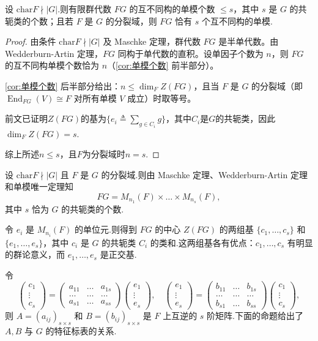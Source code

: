 \begin{theorem}
设 $\mathrm{char}F \nmid |G|$.则有限群代数 $FG$ 的互不同构的单模个数 $\leq s$，其中 $s$ 是 $G$ 的共轭类的个数；且若 $F$ 是 $G$ 的分裂域，则 $FG$ 恰有 $s$ 个互不同构的单模.
\end{theorem}

\begin{proof}
由条件 $\mathrm{char}F \nmid |G|$ 及 Maschke 定理，群代数 $FG$ 是半单代数。由 Wedderburn-Artin 定理，$FG$ 同构于单代数的直积。设单因子个数为 $n$，则 $FG$ 的互不同构单模个数恰为 $n$（\cref{cor:单模个数} 前半部分）。

\cref{cor:单模个数} 后半部分给出：$n \leq \dim_F Z(FG)$，且当 $F$ 是 $G$ 的分裂域（即 $\operatorname{End}_{FG}(V) \cong F$ 对所有单模 $V$ 成立）时取等号。

\noindent{} 前文已证明$Z(FG)$的基为$\{e_i\triangleq \sum_{g\in C_i}g\}$，其中$C_i$是$G$的共轭类，因此$\dim_F Z(FG)=s$.\par
综上所述$n \leq s$，且$F$为分裂域时$n = s$.
\end{proof}

设 $\mathrm{char}F \nmid |G|$ 且 $F$ 是 $G$ 的分裂域.则由 Maschke 定理、Wedderburn-Artin 定理和单模唯一定理知
$$
FG = M_{n_1}(F) \times \dots \times M_{n_s}(F),
$$
其中 $s$ 恰为 $G$ 的共轭类的个数.



令 $e_i$ 是 $M_{n_i}(F)$ 的单位元.则得到 $FG$ 的中心 $Z(FG)$ 的两组基 $\{c_1, \dots, c_s\}$ 和 $\{e_1, \dots, e_s\}$，其中 $c_i$ 是 $G$ 的共轭类 $C_i$ 的类和.这两组基各有优点：$c_1, \dots, c_s$ 有明显的群论意义，而 $e_1, \dots, e_s$ 是正交基.

令
$$
\begin{pmatrix} c_1 \\ \vdots \\ c_s \end{pmatrix}
= \begin{pmatrix}
a_{11} & \dots & a_{1s} \\
\dots & \dots & \dots \\
a_{s1} & \dots & a_{ss}
\end{pmatrix}
\begin{pmatrix} e_1 \\ \vdots \\ e_s \end{pmatrix}, \quad
\begin{pmatrix} e_1 \\ \vdots \\ e_s \end{pmatrix}
= \begin{pmatrix}
b_{11} & \dots & b_{1s} \\
\dots & \dots & \dots \\
b_{s1} & \dots & b_{ss}
\end{pmatrix}
\begin{pmatrix} c_1 \\ \vdots \\ c_s \end{pmatrix},
$$
则 $A = (a_{ij})_{s \times s}$ 和 $B = (b_{ij})_{s \times s}$ 是 $F$ 上互逆的 $s$ 阶矩阵.下面的命题给出了 $A, B$ 与 $G$ 的特征标表的关系.

